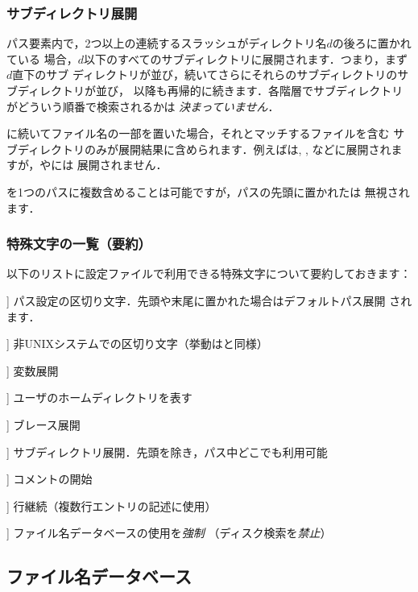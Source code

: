 \documentclass[uplatex,dvipdfmx]{jsarticle}
\begin{document}
\subsubsection{サブディレクトリ展開}
\label{sec:subdirectory-expansion}

パス要素内で，2つ以上の連続するスラッシュがディレクトリ名$d$の後ろに置かれている
場合，$d$以下のすべてのサブディレクトリに展開されます．つまり，まず$d$直下のサブ
ディレクトリが並び，続いてさらにそれらのサブディレクトリのサブディレクトリが並び，
以降も再帰的に続きます．各階層でサブディレクトリがどういう順番で検索されるかは
\emph{決まっていません}．

\samp{//}に続いてファイル名の一部を置いた場合，それとマッチするファイルを含む
サブディレクトリのみが展開結果に含められます．例えばは,
, などに展開されますが，やには
展開されません．

\samp{//}を1つのパスに複数含めることは可能ですが，パスの先頭に置かれた\samp{//}は
無視されます．

\subsubsection{特殊文字の一覧（要約）}

以下のリストに\KPS 設定ファイルで利用できる特殊文字について要約しておきます：
%
\begin{description}
\newcommand{\CODE}[1]{\makebox[3em][l]{\code{#1}}}
\item[\CODE{:}] パス設定の区切り文字．先頭や末尾に置かれた場合はデフォルトパス展開
  されます．
\item[\CODE{;}] 非UNIXシステムでの区切り文字（挙動は\code{:}と同様）
\item[\CODE{\$}] 変数展開
\item[\CODE{\string~}] ユーザのホームディレクトリを表す
\item[\CODE{\char`\{...\char`\}}] ブレース展開
\item[\CODE{//}] サブディレクトリ展開．先頭を除き，パス中どこでも利用可能
\item[\CODE{\%}] コメントの開始
\item[\CODE{\bs}] 行継続（複数行エントリの記述に使用）
\item[\CODE{!!}] ファイル名データベースの使用を\emph{強制}
  （ディスク検索を\emph{禁止}）
\end{description}

\subsection{ファイル名データベース}
\label{sec:filename-database}
\end{document}
